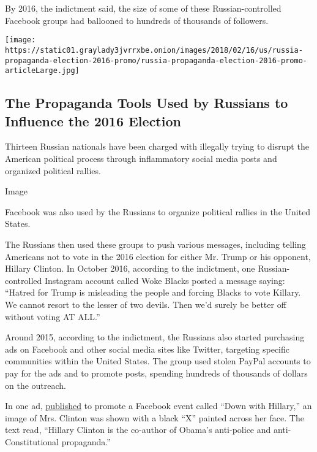 By 2016, the indictment said, the size of some of these
Russian-controlled Facebook groups had ballooned to hundreds of
thousands of followers.

\href{https://www.nytimes3xbfgragh.onion/interactive/2018/02/16/us/politics/russia-propaganda-election-2016.html}{}

\texttt{[image: https://static01.graylady3jvrrxbe.onion/images/2018/02/16/us/russia-propaganda-election-2016-promo/russia-propaganda-election-2016-promo-articleLarge.jpg]}

\hypertarget{the-propaganda-tools-used-by-russians-to-influence-the-2016-election}{%
\subsection{The Propaganda Tools Used by Russians to Influence the 2016
Election}\label{the-propaganda-tools-used-by-russians-to-influence-the-2016-election}}

Thirteen Russian nationals have been charged with illegally trying to
disrupt the American political process through inflammatory social media
posts and organized political rallies.

Image

Facebook was also used by the Russians to organize political rallies in
the United States.

The Russians then used these groups to push various messages, including
telling Americans not to vote in the 2016 election for either Mr. Trump
or his opponent, Hillary Clinton. In October 2016, according to the
indictment, one Russian-controlled Instagram account called Woke Blacks
posted a message saying: ``Hatred for Trump is misleading the people and
forcing Blacks to vote Killary. We cannot resort to the lesser of two
devils. Then we'd surely be better off without voting AT ALL.''

Around 2015, according to the indictment, the Russians also started
purchasing ads on Facebook and other social media sites like Twitter,
targeting specific communities within the United States. The group used
stolen PayPal accounts to pay for the ads and to promote posts, spending
hundreds of thousands of dollars on the outreach.

In one ad,
\href{https://www.nytimes3xbfgragh.onion/2017/11/01/us/politics/russia-2016-election-facebook.html}{published}
to promote a Facebook event called ``Down with Hillary,'' an image of
Mrs. Clinton was shown with a black ``X'' painted across her face. The
text read, ``Hillary Clinton is the co-author of Obama's anti-police and
anti-Constitutional propaganda.''

